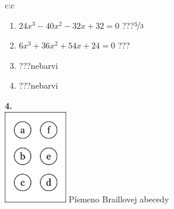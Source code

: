 \documentclass[10pt]{report}
\begin{document}
\begin{tabular}{c:c}
\begin{minipage}[c][99mm][t]{0.49\linewidth}
\begin{center}
\begin{minipage}{0.77\linewidth}
\begin{center}
\begin{varwidth}{\textwidth}
\begin{enumerate}
\item $24x^3-40x^2-32x+32=0$\quad \dotfill\; ???\;\dotfill \quad $\nicefrac{5}{3}$
\item $6x^3+36x^2+54x+24=0$\quad \dotfill\; ???\;\dotfill {}
\item \quad \dotfill\; ???\;\dotfill \quad nebarvi
\item \quad \dotfill\; ???\;\dotfill \quad nebarvi
\end{enumerate}
\end{varwidth}
\end{center}
\end{minipage}
\begin{minipage}{0.20\linewidth}
\begin{center}
{\Huge\bfseries 4.} \\[2mm]
\includegraphics[height=40mm]{../images/braille.png}
{\small Písmeno Braillovej abecedy}
\end{center}
\end{minipage}
\end{center}
\end{minipage}

\end{tabular}
\clearpage
\thispagestyle{empty}
\end{document}
